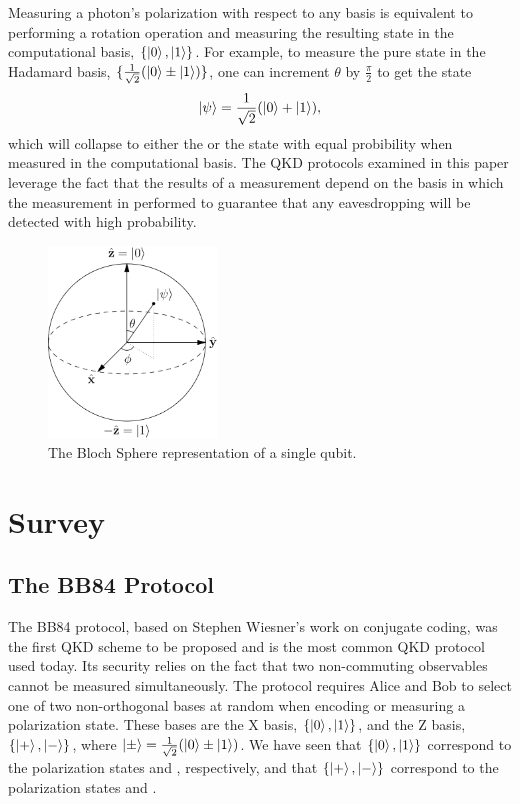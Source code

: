 \documentclass[conference]{IEEEtran}
\begin{document}
Measuring a photon's polarization with respect to any basis is equivalent to performing a rotation operation and measuring the resulting state in the computational basis, $\{\left\vert{0}\right\rangle, \left\vert{1}\right\rangle\}$. For example, to measure the pure state  in the Hadamard basis, $\{\frac{1}{\sqrt{2}}(\left\vert{0}\right\rangle\pm\left\vert{1}\right\rangle)\}$, one can increment $\theta$ by $\frac{\pi}{2}$ to get the state \[ \left\vert{\psi}\right\rangle = \frac{1}{\sqrt{2}}(\left\vert{0}\right\rangle + \left\vert{1}\right\rangle), \] which will collapse to either the  or the  state with equal probibility when measured in the computational basis. The QKD protocols examined in this paper leverage the fact that the results of a measurement depend on the basis in which the measurement in performed to guarantee that any eavesdropping will be detected with high probability.\\
\begin{figure}[h]
  \hspace*{1.2cm}\includegraphics[width=0.4\textwidth]{bloch-sphere.png}
  \caption{The Bloch Sphere representation of a single qubit\cite{Wikipedia}.}
  \label{fig:blochSphere}
  \end{figure}
\section{Survey}
\subsection{The BB84 Protocol}
The BB84 protocol, based on Stephen Wiesner's work on conjugate coding\cite{Wiesner}, was the first QKD scheme to be proposed and is the most common QKD protocol used today. Its security relies on the fact that two non-commuting observables cannot be measured simultaneously. The protocol requires Alice and Bob to select one of two non-orthogonal bases at random when encoding or measuring a polarization state. These bases are the X basis, $\{\left\vert{0}\right\rangle, \left\vert{1}\right\rangle\}$, and the Z basis, $\{\left\vert{+}\right\rangle, \left\vert{-}\right\rangle\}$, where $\left\vert{\pm}\right\rangle = \frac{1}{\sqrt{2}}(\left\vert{0}\right\rangle\pm\left\vert{1}\right\rangle)$. We have seen that $\{\left\vert{0}\right\rangle, \left\vert{1}\right\rangle\}$ correspond to the polarization states \ket{\uparrow} and \ket{\rightarrow}, respectively, and that $\{\left\vert{+}\right\rangle, \left\vert{-}\right\rangle\}$ correspond to the polarization states \ket{\nwarrow} and \ket{\nearrow}.\\
\end{document}
